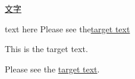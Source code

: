 \documentclass{article}
\begin{document}
\href{https://www.overleaf.com/project/62a2fafe3ae9f98d587c2bbe}{文字}




text here\label{lab1}
\newpage
Please see the\hyperref[lab1]{target text}





\hypertarget{mytarget}{This is the target text.}
\newpage
Please see the \hyperlink{mytarget}{target text}.
\end{document}
